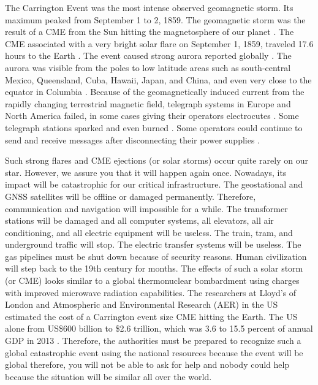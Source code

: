 \documentclass[sn-aps]{sn-jnl}%
\begin{document}
The Carrington Event was the most intense observed geomagnetic storm. Its maximum peaked from September 1 to 2, 1859. The geomagnetic storm was the result of a CME from the Sun hitting the magnetosphere of our planet \cite{tsurutani03:_septem}. The CME associated with a very bright solar flare on September 1, 1859, traveled 17.6 hours to the Earth \cite{odenwald08:_bracin}.  The event caused strong aurora reported globally \cite{kimball60:_study_auror}. The aurora was visible from the poles to low latitude areas such as south-central Mexico, Queensland, Cuba, Hawaii, Japan, and China, and even very close to the equator in Columbia \cite{hayakawa18:_low_auror_extrem_space_weath_event,gonzalez-esparza18:_obser_low_latit_red_auror,green06:_durat,hayakawa16:_east_asian_carrin,moreno16:_colom}. Because of the geomagnetically induced current from the rapidly changing terrestrial magnetic field, telegraph systems in Europe and North America failed, in some cases giving their operators electrocutes \cite{societal08:_sever_space_weath_event}. Some telegraph stations sparked and even burned \cite{odenwald02:_cycle}. Some operators could continue to send and receive messages after disconnecting their power supplies \cite{carlowicz02:_storm_sun}.

Such strong flares and CME ejections (or solar storms) occur quite rarely on our star. However, we assure you that it will happen again once. Nowadays, its impact will be catastrophic for our critical infrastructure. The geostational and GNSS satellites will be offline or damaged permanently. Therefore, communication and navigation will impossible for a while. The transformer stations will be damaged and all computer systems, all elevators, all air conditioning, and all electric equipment will be useless. The train, tram, and underground traffic will stop. The electric transfer systems will be useless. The gas pipelines must be shut down because of security reasons. Human civilization will step back to the 19th century for months. The effects of such a solar storm (or CME) looks similar to a global thermonuclear bombardment using charges with improved microwave radiation capabilities. The researchers at Lloyd's of London and Atmospheric and Environmental Research (AER) in the US estimated the cost of a Carrington event size CME hitting the Earth. The US alone from US\$600 billion to \$2.6 trillion, which was 3.6 to 15.5 percent of annual GDP in 2013 \cite{london13:_solar_storm_risk_north_americ_elect_grid}.  Therefore, the authorities must be prepared to recognize such a global catastrophic event using the national resources because the event will be global therefore, you will not be able to ask for help and nobody could help because the situation will be similar all over the world. 
\end{document}

